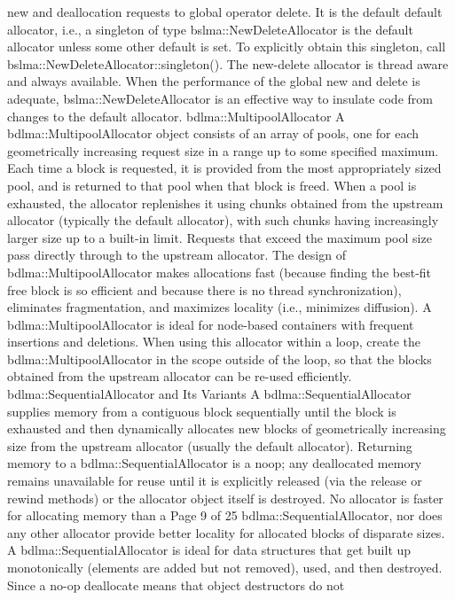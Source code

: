 new and deallocation requests to global operator delete. It is the default
default allocator, i.e., a singleton of type bslma::NewDeleteAllocator is the
default allocator unless some other default is set. To explicitly obtain this
singleton, call bslma::NewDeleteAllocator::singleton(). The new-delete
allocator is thread aware and always available. When the performance of the
global new and delete is adequate, bslma::NewDeleteAllocator is an effective
way to insulate code from changes to the default allocator.
bdlma::MultipoolAllocator
A bdlma::MultipoolAllocator object consists of an array of pools, one for each
geometrically increasing request size in a range up to some specified
maximum. Each time a block is requested, it is provided from the most
appropriately sized pool, and is returned to that pool when that block is freed.
When a pool is exhausted, the allocator replenishes it using chunks obtained
from the upstream allocator (typically the default allocator), with such chunks
having increasingly larger size up to a built-in limit. Requests that exceed the
maximum pool size pass directly through to the upstream allocator. The design
of bdlma::MultipoolAllocator makes allocations fast (because finding the
best-fit free block is so efficient and because there is no thread
synchronization), eliminates fragmentation, and maximizes locality (i.e.,
minimizes diffusion).
A bdlma::MultipoolAllocator is ideal for node-based containers with frequent
insertions and deletions. When using this allocator within a loop, create the
bdlma::MultipoolAllocator in the scope outside of the loop, so that the blocks
obtained from the upstream allocator can be re-used efficiently.
bdlma::SequentialAllocator and Its Variants
A bdlma::SequentialAllocator supplies memory from a contiguous block
sequentially until the block is exhausted and then dynamically allocates new
blocks of geometrically increasing size from the upstream allocator (usually the
default allocator). Returning memory to a bdlma::SequentialAllocator is a noop; any deallocated memory remains unavailable for reuse until it is explicitly
released (via the release or rewind methods) or the allocator object itself is
destroyed. No allocator is faster for allocating memory than a
Page 9 of 25
bdlma::SequentialAllocator, nor does any other allocator provide better
locality for allocated blocks of disparate sizes.
A bdlma::SequentialAllocator is ideal for data structures that get built up
monotonically (elements are added but not removed), used, and then
destroyed. Since a no-op deallocate means that object destructors do not
